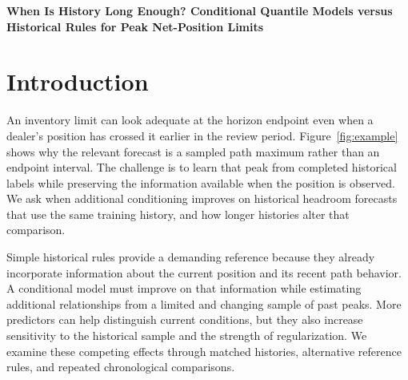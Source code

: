\documentclass[11pt,a4paper]{article}
\begin{document}
\begin{center}\Large\bfseries When Is History Long Enough? Conditional Quantile Models versus Historical Rules for Peak Net-Position Limits\end{center}

\begin{abstract}Peak-position limits concern the largest absolute inventory reached before a review ends, making completed path labels and the observed current position central to forecasting. We compare historical and conditional quantile reports for an FX market maker and weekly primary-dealer position aggregates, using matched histories and update schedules. Simple historical rules remain demanding benchmarks across frequencies, position categories and reference choices. At the shorter horizon, long-history FX regression lowers matched loss by 14.8\% and 16.6\% in the previously reported later and earlier windows. A post hoc history-to-horizon display summarizes pooled simulation tasks, and a new simulation passes its prespecified history-region screens. Retrospective FX curves partly agree with the resulting cutpoint bands, while censoring, large-history reversals and failed universal simplification limit that evidence. For limit managers, these findings motivate matching completed-label histories before assessing conditional forecasts jointly on score, breaches and stability.\end{abstract}

\section{Introduction}\label{sec:intro}

An inventory limit can look adequate at the horizon endpoint even when a dealer's position has crossed it earlier in the review period. Figure~\ref{fig:example} shows why the relevant forecast is a sampled path maximum rather than an endpoint interval. The challenge is to learn that peak from completed historical labels while preserving the information available when the position is observed. We ask when additional conditioning improves on historical headroom forecasts that use the same training history, and how longer histories alter that comparison.


Simple historical rules provide a demanding reference because they already incorporate information about the current position and its recent path behavior. A conditional model must improve on that information while estimating additional relationships from a limited and changing sample of past peaks. More predictors can help distinguish current conditions, but they also increase sensitivity to the historical sample and the strength of regularization. We examine these competing effects through matched histories, alternative reference rules, and repeated chronological comparisons.
\end{document}
